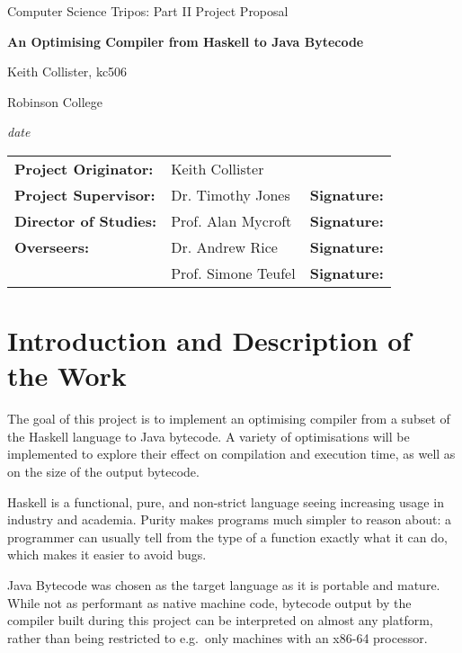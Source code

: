 \documentclass[12pt]{article}
\begin{document}
\thispagestyle{empty}

\centerline{\large Computer Science Tripos: Part II Project Proposal}
\vspace{0.4in}
\centerline{\Large\bf An Optimising Compiler from Haskell to Java Bytecode}
\vspace{0.3in}

\centerline{Keith Collister, kc506}
\centerline{Robinson College}

\centerline{\large \emph{date}}

\vspace{1in}

\begin{tabular}{ p{4cm} p{4.5cm} l }
{\bf Project Originator:} & Keith Collister & \\[3mm]
{\bf Project Supervisor:} & Dr. Timothy Jones & {\bf Signature:} \\[3mm]
{\bf Director of Studies:} & Prof. Alan Mycroft & {\bf Signature:} \\[3mm]
{\bf Overseers:} & Dr. Andrew Rice & {\bf Signature:} \\[3mm]
                 & Prof. Simone Teufel & {\bf Signature:} \\[3mm]
\end{tabular}

\vspace{0.75in}



\section*{Introduction and Description of the Work}

The goal of this project is to implement an optimising compiler from a subset of the Haskell language to Java bytecode.
A variety of optimisations will be implemented to explore their effect on compilation and execution time, as well as on
the size of the output bytecode.

Haskell is a functional, pure, and non-strict language seeing increasing usage in industry and academia. Purity makes
programs much simpler to reason about: a programmer can usually tell from the type of a function exactly what it can do,
which makes it easier to avoid bugs.

Java Bytecode was chosen as the target language as it is portable and mature. While not as performant as native machine
code, bytecode output by the compiler built during this project can be interpreted on almost any platform, rather than
being restricted to e.g.\ only machines with an x86-64 processor.
\end{document}

